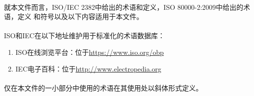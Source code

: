 \paragraph{}
就本文件而言，ISO/IEC 2382中给出的术语和定义，ISO 80000-2:2009中给出的术语，定义
和符号以及以下内容适用于本文件。

\paragraph{}
ISO和IEC在以下地址维护用于标准化的术语数据库：
\begin{enumerate}
  \item ISO在线浏览平台：位于\href{https://www.iso.org/obp}
        {https://www.iso.org/obp}
  \item IEC电子百科：位于\href{http://www.electropedia.org}
        {http://www.electropedia.org}
\end{enumerate}

\paragraph{}
仅在本文件的一小部分中使用的术语在其使用处以斜体形式定义。
